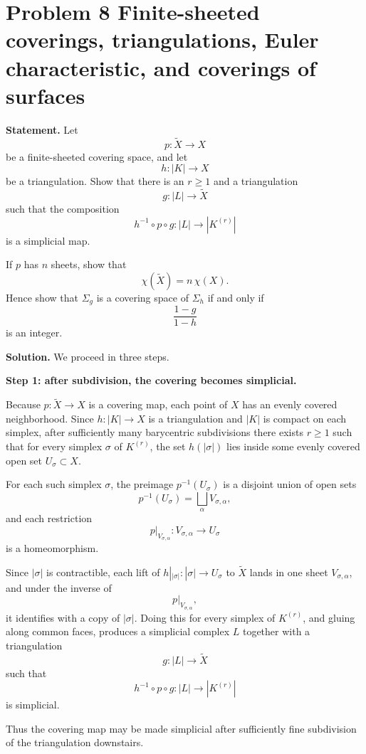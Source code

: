 \documentclass[12pt,a4paper]{article}
\theoremstyle{notespace}
\begin{document}
\section{Problem 8 Finite-sheeted coverings, triangulations, Euler characteristic, and coverings of surfaces}

\textbf{Statement.}
Let
\[
p:\widetilde X \to X
\]
be a finite-sheeted covering space, and let
\[
h:|K|\to X
\]
be a triangulation. Show that there is an \(r\ge 1\) and a triangulation
\[
g:|L|\to \widetilde X
\]
such that the composition
\[
h^{-1}\circ p\circ g:|L|\to |K^{(r)}|
\]
is a simplicial map.

If \(p\) has \(n\) sheets, show that
\[
\chi(\widetilde X)=n\,\chi(X).
\]
Hence show that \(\Sigma_g\) is a covering space of \(\Sigma_h\) if and only if
\[
\frac{1-g}{1-h}
\]
is an integer.

\bigskip

\textbf{Solution.}
We proceed in three steps.

\medskip

\textbf{Step 1: after subdivision, the covering becomes simplicial.}

Because \(p:\widetilde X\to X\) is a covering map, each point of \(X\) has an evenly covered neighborhood. Since \(h:|K|\to X\) is a triangulation and \(|K|\) is compact on each simplex, after sufficiently many barycentric subdivisions there exists \(r\ge 1\) such that for every simplex \(\sigma\) of \(K^{(r)}\), the set \(h(|\sigma|)\) lies inside some evenly covered open set \(U_\sigma\subset X\).

For each such simplex \(\sigma\), the preimage \(p^{-1}(U_\sigma)\) is a disjoint union of open sets
\[
p^{-1}(U_\sigma)=\bigsqcup_\alpha V_{\sigma,\alpha},
\]
and each restriction
\[
p|_{V_{\sigma,\alpha}}:V_{\sigma,\alpha}\to U_\sigma
\]
is a homeomorphism.

Since \(|\sigma|\) is contractible, each lift of \(h|_{|\sigma|}:|\sigma|\to U_\sigma\) to \(\widetilde X\) lands in one sheet \(V_{\sigma,\alpha}\), and under the inverse of
\[
p|_{V_{\sigma,\alpha}},
\]
it identifies with a copy of \(|\sigma|\). Doing this for every simplex of \(K^{(r)}\), and gluing along common faces, produces a simplicial complex \(L\) together with a triangulation
\[
g:|L|\to \widetilde X
\]
such that
\[
h^{-1}\circ p\circ g:|L|\to |K^{(r)}|
\]
is simplicial.

Thus the covering map may be made simplicial after sufficiently fine subdivision of the triangulation downstairs.
\end{document}
